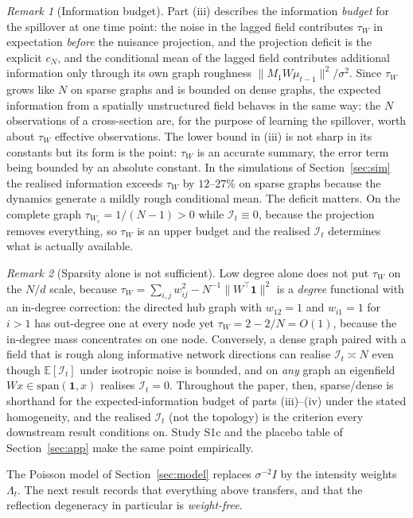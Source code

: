 \documentclass[12pt]{article}
\theoremstyle{plain}
\theoremstyle{definition}
\theoremstyle{remark}
\newtheorem{remark}{Remark}
\newcommand{\E}{\mathbb{E}}
\newcommand{\one}{\mathbf{1}}
\newcommand{\calI}{\mathcal{I}}
\newcommand{\Wc}{W_{\mathrm{c}}}
\newcommand{\tauW}{\tau_W}
\newcommand{\T}{^{\top}}
\begin{document}
\begin{remark}[Information budget]
Part (iii) describes the information \emph{budget} for the spillover at one time point: the noise in the lagged field contributes $\tauW$ in expectation \emph{before} the nuisance projection, and the projection deficit is the explicit $c_N$, and the conditional mean of the lagged field contributes additional information only through its own graph roughness $\|M_1W\mu_{t-1}\|^2/\sigma^2$. Since $\tauW$ grows like $N$ on sparse graphs and is bounded on dense graphs, the expected information from a spatially unstructured field behaves in the same way: the $N$ observations of a cross-section are, for the purpose of learning the spillover, worth about $\tauW$ effective observations. The lower bound in (iii) is not sharp in its constants but its form is the point: $\tauW$ is an accurate summary, the error term being bounded by an absolute constant. In the simulations of Section~\ref{sec:sim} the realised information exceeds $\tauW$ by $12$--$27\%$ on sparse graphs because the dynamics generate a mildly rough conditional mean.
 The deficit matters. On the complete graph $\tau_{\Wc}=1/(N-1)>0$ while $\calI_t\equiv0$, because the projection removes everything, so $\tauW$ is an upper budget and the realised $\calI_t$ determines what is actually available.
\end{remark}

\begin{remark}[Sparsity alone is not sufficient]\label{rem:hub}
Low degree alone does not put $\tauW$ on the $N/d$ scale, because $\tauW=\sum_{i,j}w_{ij}^2-N^{-1}\|W\T\one\|^2$ is a \emph{degree} functional with an in-degree correction: the directed hub graph with $w_{12}=1$ and $w_{i1}=1$ for $i>1$ has out-degree one at every node yet $\tauW=2-2/N=O(1)$, because the in-degree mass concentrates on one node. Conversely, a dense graph paired with a field that is rough along informative network directions can realise $\calI_t\asymp N$ even though $\E[\calI_t]$ under isotropic noise is bounded, and on \emph{any} graph an eigenfield $Wx\in\mathrm{span}(\one,x)$ realises $\calI_t=0$. Throughout the paper, then, sparse/dense is shorthand for the expected-information budget of parts (iii)--(iv) under the stated homogeneity, and the realised $\calI_t$ (not the topology) is the criterion every downstream result conditions on. Study S1c and the placebo table of Section~\ref{sec:app} make the same point empirically.\end{remark}

The Poisson model of Section~\ref{sec:model} replaces $\sigma^{-2}I$ by the intensity weights $\Lambda_t$. The next result records that everything above transfers, and that the reflection degeneracy in particular is \emph{weight-free}.
\end{document}
